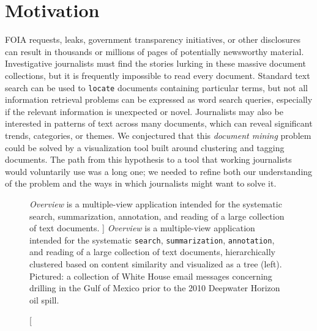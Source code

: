 
\section{Motivation}
\label{overview:introduction}


\ac{FOIA} requests, leaks, government transparency initiatives, or other disclosures can result in thousands or millions of pages of potentially newsworthy material.
Investigative journalists must find the stories lurking in these massive document collections, but it is frequently impossible to read every document.
Standard text search can be used to {\tt locate} documents containing particular terms, but not all information retrieval problems can be expressed as word search queries, especially if the relevant information is unexpected or novel.
Journalists may also be interested in patterns of text across many documents, which can reveal significant trends, categories, or themes.
We conjectured that this {\it document mining} problem could be solved by a visualization tool built around clustering and tagging documents.
The path from this hypothesis to a tool that working journalists would voluntarily use was a long one; we needed to refine both our understanding of the problem and the ways in which journalists might want to solve it.


\begin{figure}
	\centering
	\caption
	[
	    \textsl{Overview} is a multiple-view application intended for the systematic search, summarization, annotation, and reading of a large collection of text documents.
	]
	{
    	\textsl{Overview} is a multiple-view application intended for the systematic {\tt search}, {\tt summarization}, {\tt annotation}, and reading of a large collection of text documents, hierarchically clustered based on content similarity and visualized as a tree (left). 
    	Pictured: a collection of White House email messages concerning drilling in the Gulf of Mexico prior to the 2010 Deepwater Horizon oil spill. 
	}
	\centering
	\label{overview:fig:overview-v4-teaser}
\end{figure}

